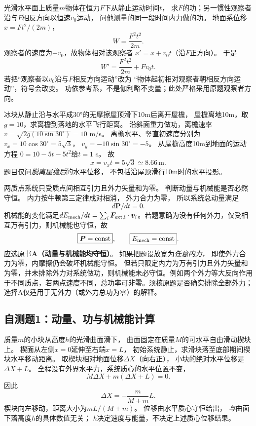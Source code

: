 \problemtext 光滑水平面上质量$m$物体在恒力$F$下从静止运动时间$t$，
求$F$的功；另一惯性观察者沿与$F$相反方向以恒速$v_0$运动，
问他测量的同一段时间内力做的功。
\workings
地面系位移$x=Ft^2/(2m)$，
\[
\boxed{W=\frac{F^2t^2}{2m}}.
\]
观察者的速度为$-v_0$，故物体相对该观察者
$x'=x+v_0t$（沿$F$正方向）。
于是
\[
\boxed{W'=\frac{F^2t^2}{2m}+Fv_0t}.
\]
\crosscheck 若把“观察者以$v_0$沿与$F$相反方向运动”改为
“物体起初相对观察者朝相反方向运动”，符号会改变。
功依参考系，不是伽利略不变量；此处严格采用原题观察者方向。

\problemtext 冰块从静止沿与水平成30°的无摩擦屋顶滑下10m后离开屋檐，
屋檐离地10m，取$g=10$，求离檐到落地的水平飞行距离。
\workings
沿斜面重力做功，离檐速率
$v=\sqrt{2g(10\sin30^\circ)}=10$ m/s。
离檐水平、竖直初速度分别为
$v_x=10\cos30^\circ=5\sqrt3$，
$v_y=-10\sin30^\circ=-5$。
从屋檐高度10m到地面的运动方程
$0=10-5t-5t^2$给$t=1$ s。
故
\[
\boxed{x=v_xt=5\sqrt3\simeq8.66\,\mathrm m}.
\]
\crosscheck 题目仅问\emph{脱离屋檐后}的水平位移，
不包括沿屋顶滑行10m时的水平投影。

\problemtext 两质点系统只受质点间相互引力且外力矢量和为零。
判断动量与机械能是否必然守恒。
\workings
内力按牛顿第三定律成对相消，
外力合力为零，
所以系统总动量满足
\[
\boxed{d\bm P/dt=0}.
\]
机械能的变化满足$dE_{\rm mech}/dt=\sum_i\bm F_{\rm ext,i}\cdot\bm v_i$。若题意确为没有任何外力，仅受相互万有引力，则机械能也守恒，故
\[
\boxed{\bm P=\mathrm{const}},\qquad
\boxed{E_{\rm mech}=\mathrm{const}}.
\]
应选原书\textbf{A（动量与机械能均守恒）}。
\crosscheck 如果把题设放宽为\emph{任意内力}，
即使外力合力为零，内摩擦仍会破坏机械能守恒。
但若只限定内力为万有引力且外力矢量和为零，并未排除外力对系统做功，则机械能未必守恒。例如两个外力等大反向作用于不同质点，若两点速度不同，总功率可非零。须核原题是否确实排除全部外力；选择A仅适用于无外力（或外力总功为零）的解释。

\subsection{自测题1：动量、功与机械能计算}

\problemtext 质量$m$的小块从高度$h$的光滑曲面滑下，
曲面固定在质量$M$的可水平自由滑动楔块上。
楔面从左侧$x=0$延伸至右端$x=L$，
初始系统静止，求滑块落至底部期间楔块水平移动距离。
\workings
取楔块相对地面位移$\Delta X$（向右正），
小块的绝对水平位移是$\Delta X+L$。
全程没有外界水平力，系统质心的水平位置不变，
\[
M\Delta X+m(\Delta X+L)=0.
\]
因此
\[
\boxed{\Delta X=-\frac{m}{M+m}L}.
\]
楔块向左移动，距离大小为$mL/(M+m)$。
\crosscheck 位移由水平质心守恒给出，
\emph{与}曲面下落高度$h$的具体数值无关；
$h$决定速度与能量，不决定上述质心位移结果。

